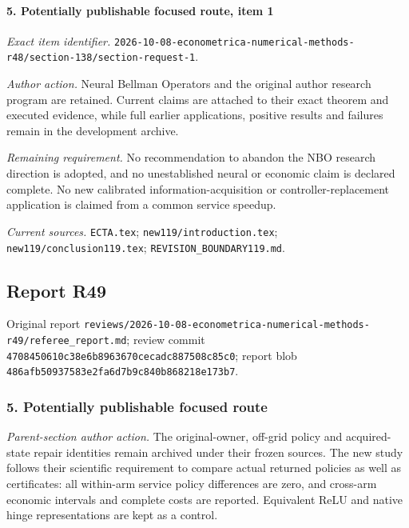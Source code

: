 \paragraph{5. Potentially publishable focused route, item 1}

\emph{Exact item identifier.} \nolinkurl{2026-10-08-econometrica-numerical-methods-r48/section-138/section-request-1}.

\par\emph{Author action.} Neural Bellman Operators and the original author research program are retained. Current claims are attached to their exact theorem and executed evidence, while full earlier applications, positive results and failures remain in the development archive.

\par\emph{Remaining requirement.} No recommendation to abandon the NBO research direction is adopted, and no unestablished neural or economic claim is declared complete. No new calibrated information-acquisition or controller-replacement application is claimed from a common service speedup.

\par\emph{Current sources.} \nolinkurl{ECTA.tex}; \nolinkurl{new119/introduction.tex}; \nolinkurl{new119/conclusion119.tex}; \nolinkurl{REVISION_BOUNDARY119.md}.

\subsection{Report R49}

Original report \nolinkurl{reviews/2026-10-08-econometrica-numerical-methods-r49/referee_report.md}; review commit \nolinkurl{4708450610c38e6b8963670cecadc887508c85c0}; report blob \nolinkurl{486afb50937583e2fa6d7b9c840b868218e173b7}.

\subsubsection{5. Potentially publishable focused route}

\emph{Parent-section author action.} The original-owner, off-grid policy and acquired-state repair identities remain archived under their frozen sources. The new study follows their scientific requirement to compare actual returned policies as well as certificates: all within-arm service policy differences are zero, and cross-arm economic intervals and complete costs are reported. Equivalent ReLU and native hinge representations are kept as a control.


